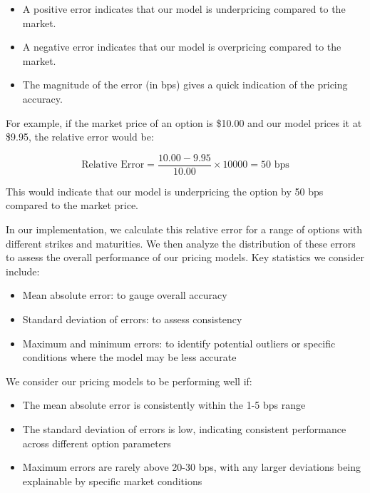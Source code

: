 \documentclass[12pt]{article}
\begin{document}
\begin{itemize}
    \item A positive error indicates that our model is underpricing compared to the market.
    \item A negative error indicates that our model is overpricing compared to the market.
    \item The magnitude of the error (in bps) gives a quick indication of the pricing accuracy.
\end{itemize}

For example, if the market price of an option is \$10.00 and our model prices it at \$9.95, the relative error would be:

\begin{equation}
    \text{Relative Error} = \frac{10.00 - 9.95}{10.00} \times 10000 = 50 \text{ bps}
\end{equation}

This would indicate that our model is underpricing the option by 50 bps compared to the market price.

In our implementation, we calculate this relative error for a range of options with different strikes and maturities. We then analyze the distribution of these errors to assess the overall performance of our pricing models. Key statistics we consider include:

\begin{itemize}
    \item Mean absolute error: to gauge overall accuracy
    \item Standard deviation of errors: to assess consistency
    \item Maximum and minimum errors: to identify potential outliers or specific conditions where the model may be less accurate
\end{itemize}

We consider our pricing models to be performing well if:

\begin{itemize}
    \item The mean absolute error is consistently within the 1-5 bps range
    \item The standard deviation of errors is low, indicating consistent performance across different option parameters
    \item Maximum errors are rarely above 20-30 bps, with any larger deviations being explainable by specific market conditions
\end{itemize}
\end{document}
